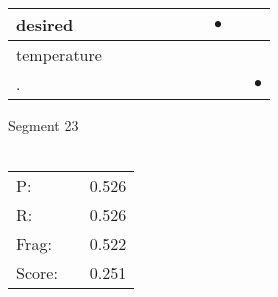 \documentclass[landscape]{article}
\newcommand{\ssp}{\hspace{2pt}}
\newcommand{\mex}{\cellcolor{g}$\bullet$}
\begin{document}
\begin{tabular}{|l|p{10pt}|p{10pt}|p{10pt}|p{10pt}|p{10pt}|p{10pt}|p{10pt}|p{10pt}|p{10pt}|}
\hline
\ssp \cellcolor{ref6}desired \ssp&\hspace{2pt}&\hspace{2pt}&\hspace{2pt}&\hspace{2pt}&\hspace{2pt}&\hspace{2pt}&\hspace{2pt}\mex&\hspace{2pt}&\hspace{2pt}\\
\hline
\ssp temperature \ssp&\hspace{2pt}&\hspace{2pt}&\hspace{2pt}&\hspace{2pt}&\hspace{2pt}&\hspace{2pt}&\hspace{2pt}&\hspace{2pt}&\hspace{2pt}\\
\hline
\ssp \cellcolor{ref8}. \ssp&\hspace{2pt}&\hspace{2pt}&\hspace{2pt}&\hspace{2pt}&\hspace{2pt}&\hspace{2pt}&\hspace{2pt}&\hspace{2pt}&\hspace{2pt}\mex\\
\hline
\end{tabular}

\vspace{6pt}
\noindent Segment 23\\\\
\noindent\begin{tabular}{lm{12pt}r}
\hline
P:&&0.526\\
R:&&0.526\\
Frag:&&0.522\\
Score:&&0.251\\
\end{tabular}

\newpage
\end{document}
